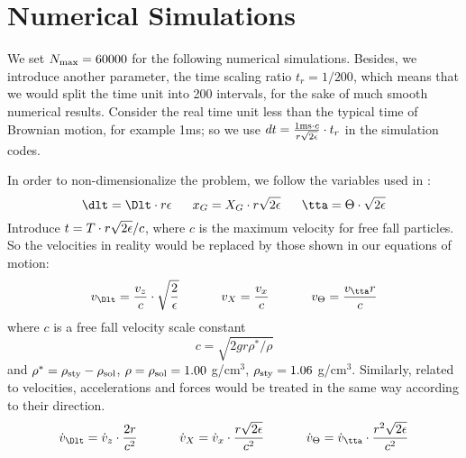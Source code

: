\documentclass[fleqn,10pt]{InternshipReport_SI-ENS-PSL}
\begin{document}



\section*{Numerical Simulations} %



\label{Discretisation algorithm}

We set $N_{\mathrm{max}} = 60000$ for the following numerical simulations. Besides, we introduce another parameter, the time scaling ratio $t_r = 1/200$, which means that we would split the time unit into 200 intervals, for the sake of much smooth numerical results. Consider the real time unit less than the typical time of Brownian motion, for example 1ms; so we use $dt = \frac{1\mathrm{ms} \cdot c}{r \sqrt{2\epsilon}} \cdot t_r$ in the simulation codes.



In order to non-dimensionalize the problem, we follow the variables used in \cite{JFM2015}:
$$ \dlt = \Dlt \cdot r \eps \fives x_G = X_G \cdot r \sqrt{2\eps} \fives \tta = \Theta \cdot \sqrt{2\eps} $$
Introduce $t = T \cdot r \sqrt{2\epsilon} / c$, where $c$ is the maximum velocity for free fall particles. So the velocities in reality would be replaced by those shown in our equations of motion:
$$ v_\Dlt = \frac{v_z}{c} \cdot \sqrt{\frac{2}{\eps}} \tens v_X = \frac{v_x}{c} \tens v_\Theta = \frac{v_\tta r}{c} $$
where $c$ is a free fall velocity scale constant
$$ c = \sqrt{2 g r \rho^\ast / \rho} $$
and $\rho^\ast = \rho_{\mathrm{sty}} - \rho_{\mathrm{sol}}$, $\rho = \rho_{\mathrm{sol}} = 1.00$ g/cm$^3$, $\rho_{\mathrm{sty}} = 1.06$ g/cm$^3$.
Similarly, related to velocities, accelerations and forces would be treated in the same way according to their direction.
$$ \dot{v}_\Dlt = \dot{v}_z \cdot \frac{2r}{c^2} \tens \dot{v}_X = \dot{v}_x \cdot \frac{r \sqrt{2\eps}}{c^2} \tens \dot{v}_\Theta = \dot{v}_\tta \cdot \frac{r^2 \sqrt{2\eps}}{c^2} $$
\end{document}
